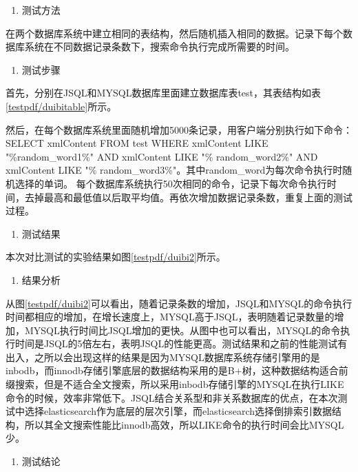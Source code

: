 \begin{enumerate}[resume]
	\item 测试方法
\end{enumerate}

在两个数据库系统中建立相同的表结构，然后随机插入相同的数据。记录下每个数据库系统在不同数据记录条数下，搜索命令执行完成所需要的时间。

\begin{enumerate}[resume]
	\item 测试步骤
\end{enumerate}

首先，分别在JSQL和MYSQL数据库里面建立数据库表test，其表结构如表\ref{testpdf/duibitable}所示。

然后，在每个数据库系统里面随机增加5000条记录，用客户端分别执行如下命令：
SELECT xmlContent FROM test WHERE xmlContent LIKE "\%random\_word1\%" 
AND xmlContent LIKE "\% random\_word2\%" AND xmlContent LIKE "\% random\_word3\%"。其中random\_word为每次命令执行时随机选择的单词。
每个数据库系统执行50次相同的命令，记录下每次命令执行时间，去掉最高和最低值以后取平均值。再依次增加数据记录条数，重复上面的测试过程。
\begin{enumerate}[resume]
	\item 测试结果
\end{enumerate}

本次对比测试的实验结果如图\ref{testpdf/duibi2}所示。

\begin{enumerate}[resume]
	\item 结果分析
\end{enumerate}

从图\ref{testpdf/duibi2}可以看出，随着记录条数的增加，JSQL和MYSQL的命令执行时间都相应的增加，在增长速度上，MYSQL高于JSQL，表明随着记录数量的增加，MYSQL执行时间比JSQL增加的更快。从图中也可以看出，MYSQL的命令执行时间是JSQL的5倍左右，表明JSQL的性能更高。测试结果和之前的性能测试有出入，之所以会出现这样的结果是因为MYSQL数据库系统存储引擎用的是inbodb，而innodb存储引擎底层的数据结构采用的是B+树，这种数据结构适合前缀搜索，但是不适合全文搜索，所以采用inbodb存储引擎的MYSQL在执行LIKE命令的时候，效率非常低下。JSQL结合关系型和非关系数据库的优点，在本次测试中选择elasticsearch作为底层的层次引擎，而elasticsearch选择倒排索引数据结构，所以其全文搜索性能比innodb高效，所以LIKE命令的执行时间会比MYSQL少。

\begin{enumerate}[resume]
	\item 测试结论
\end{enumerate}

